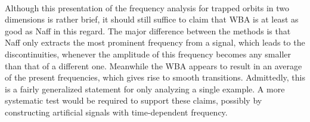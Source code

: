 \\
Although this presentation of the frequency analysis for trapped orbits in two dimensions is rather brief, it should still suffice to claim that WBA is at least as good as Naff in this regard. 
The major difference between the methods is that Naff only extracts the most prominent frequency from a signal, which leads to the discontinuities, whenever the amplitude of this frequency becomes any smaller than that of a different one.
Meanwhile the WBA appears to result in an average of the present frequencies, which gives rise to smooth transitions.
Admittedly, this is a fairly generalized statement for only analyzing a single example.
A more systematic test would be required to support these claims, possibly by constructing artificial signals with time-dependent frequency.
